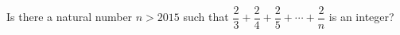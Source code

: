 Is there a natural number $n>2015$ such that $\dfrac{2}{3}+\dfrac{2}{4}+\dfrac{2}{5}+\cdots+\dfrac{2}{n}$ is an integer?
